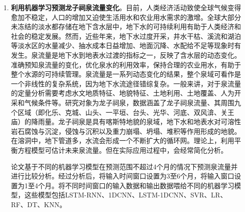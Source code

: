 \begin{enumerate}
    \item \textbf{利用机器学习预测龙子祠泉流量变化}。目前，人类经济活动致使全球气候变得愈加不稳定，人口的增加又迫使生活用水和农业用水需求的激增。全球大部分未冻结的淡水都存储在地下含水层中，地下水的可持续利用有助于人类经济和社会的稳定发展。然而，近些年来，地下水过度开采，井水干枯、溪流和湖泊等淡水区的水量减少、抽水成本日益增加、地面沉降、水配给不足等现象时有发生。泉流量是地下水到地表水过渡的指标之一，反映了含水层的动态变化。准确预知泉流量的变化，优化泉水的利用效率，保持合理的农业用水，有助于整个水源的可持续管理。泉流量是一系列动态变化的结果，整个泉域可看作是一个非线性的复杂系统，因为地下水流途径错综复杂。一般来讲，对于泉流量的定量分析需要考虑水文地质特征、地貌特征、土地利用、土地覆盖、人为开采和气候条件等。研究对象为龙子祠泉，数据涵盖了龙子祠泉流量、其周围九个区域（即化乐、克城、山头、一平垣、台头、光华、河底、双风渰、关王庙）的降雨量。龙子祠泉是具有喀斯特地貌的泉域，地下水和地表水对可溶性岩石腐蚀与沉淀，侵蚀与沉积以及重力崩塌、坍塌、堆积等作用形成的地貌。在溶洞中，地下管道多，水流会形成一个不断扩大的循环网。理论上，利用平衡方程模型可估计未来泉流量。但在实际应用过程中，会经常简化分析。
    
    论文基于不同的机器学习模型在预测范围不超过4个月的情况下预测泉流量并进行比较分析。经过分析后，将输入时间窗口设置为3至6个月，将输入窗口设置为1至4个月。将不同时间窗口的输入数据和输出数据喂给不同的机器学习模型，这些模型包括LSTM-RNN、1DCNN、LSTM-1DCNN、SVR、LR、RF、DT、KNN。


\end{enumerate}
